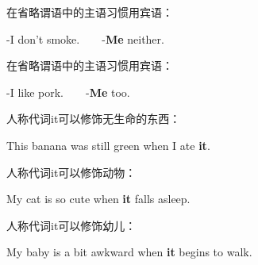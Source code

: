 \documentclass[UTF8]{ctexart}
\begin{document}
    在省略谓语中的主语习惯用宾语：
    \begin{center}
        \ttfamily\large
        -I don't smoke.~~~~-\textbf{Me} neither.\\[8mm]
    \end{center}
    在省略谓语中的主语习惯用宾语：
    \begin{center}
        \ttfamily\large
        -I like pork.~~~~-\textbf{Me} too.\\[6mm]
    \end{center}
    人称代词{\hspace{3pt}\ttfamily it}可以修饰无生命的东西：
    \begin{center}
        \ttfamily\large
        This banana was still green when I ate \textbf{it}.\\[6mm]
    \end{center}
    人称代词{\hspace{3pt}\ttfamily it}可以修饰动物：
    \begin{center}
        \ttfamily\large
        My cat is so cute when \textbf{it} falls asleep.\\[6mm]
    \end{center}
    人称代词{\hspace{3pt}\ttfamily it}可以修饰幼儿：
    \begin{center}
        \ttfamily\large
        My baby is a bit awkward when \textbf{it} begins to walk.
    \end{center}

\newpage
\end{document}
